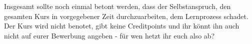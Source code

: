 \documentclass{vorkurs}
\begin{document}
Insgesamt sollte noch einmal betont werden, dass der Selbstanspruch, den gesamten Kurs in vorgegebener Zeit durchzuarbeiten, dem Lernprozess schadet.
Der Kurs wird nicht benotet, gibt keine Creditpoints und ihr könnt ihn auch nicht auf eurer Bewerbung angeben - für wen hetzt ihr euch also ab?

\tableofcontents


\end{document}
